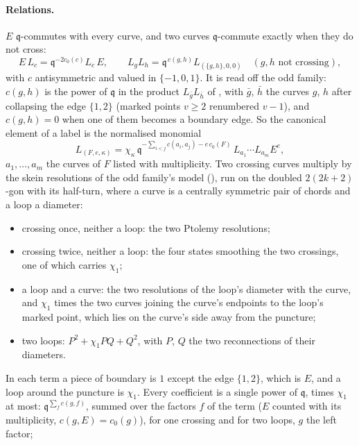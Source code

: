 \documentclass[11pt]{amsart}
\newcommand\fq{\mathfrak{q}}
\theoremstyle{remark}
\begin{document}
\paragraph{Relations.}  $E$ $\fq$-commutes with every curve, and two curves
$\fq$-commute exactly when they do not cross:
\begin{equation}\label{eq:comp-deven-qcomm}
  E\,L_c=\fq^{-2c_0(c)}L_c\,E,\qquad
  L_gL_h=\fq^{\,c(g,h)}L_{(\{g,h\},0,0)}\quad(g,h\text{ not crossing}),
\end{equation}
with $c$ antisymmetric and valued in $\{-1,0,1\}$.  It is read off the odd
family: $c(g,h)$ is the power of $\fq$ in the product $L_{\bar g}L_{\bar h}$
of , with $\bar g$, $\bar h$ the curves $g$, $h$
after collapsing the edge $\{1,2\}$ (marked points $v\ge2$ renumbered $v-1$),
and $c(g,h)=0$ when one of them becomes a boundary edge.  So the
canonical element of a label is the normalised monomial
\begin{equation}\label{eq:comp-deven-norm}
  L_{(F,e,\kappa)}=\chi_\kappa\,\fq^{-\sum_{i<j}c(a_i,a_j)-e\,c_0(F)}\,L_{a_1}\cdots L_{a_m}E^e,
\end{equation}
$a_1,\dots,a_m$ the curves of $F$ listed with multiplicity.  Two crossing
curves multiply by the skein resolutions of the odd family's model
(), run on the doubled $2(2k+2)$-gon
with its half-turn, where a curve is a centrally symmetric pair of chords and
a loop a diameter:
\begin{itemize}
\item crossing once, neither a loop: the two Ptolemy resolutions;
\item crossing twice, neither a loop: the four states smoothing the two
  crossings, one of which carries $\chi_1$;
\item a loop and a curve: the two resolutions of the loop's diameter with the
  curve, and $\chi_1$ times the two curves joining the curve's endpoints to
  the loop's marked point, which lies on the curve's side away from the
  puncture;
\item two loops: $P^2+\chi_1PQ+Q^2$, with $P$, $Q$ the two reconnections of
  their diameters.
\end{itemize}
In each term a piece of boundary is $1$ except the edge $\{1,2\}$, which is
$E$, and a loop around the puncture is $\chi_1$.  Every coefficient is a
single power of $\fq$, times $\chi_1$ at most: $\fq^{\sum_fc(g,f)}$, summed
over the factors $f$ of the term ($E$ counted with its multiplicity,
$c(g,E)=c_0(g)$), for one crossing and for two loops, $g$ the left factor;
\end{document}
